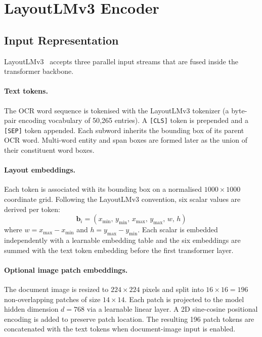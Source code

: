 \section{LayoutLMv3 Encoder}
\label{sec:layoutlmv3-encoder}

\subsection{Input Representation}
\label{sec:input-representation}

LayoutLMv3~\cite{huang2022layoutlmv3} accepts three parallel input streams that
are fused inside the transformer backbone.

\paragraph{Text tokens.}
The OCR word sequence is tokenised with the LayoutLMv3 tokenizer (a byte-pair
encoding vocabulary of 50{,}265 entries). A \texttt{[CLS]} token is prepended
and a \texttt{[SEP]} token appended. Each subword inherits the bounding box of
its parent OCR word. Multi-word entity and span boxes are formed later as the
union of their constituent word boxes.

\paragraph{Layout embeddings.}
Each token is associated with its bounding box on a normalised $1000 \times 1000$
coordinate grid. Following the LayoutLMv3 convention, six scalar values are
derived per token:
\[
  \mathbf{b}_i = (x_{\min},\, y_{\min},\, x_{\max},\, y_{\max},\, w,\, h)
\]
where $w = x_{\max} - x_{\min}$ and $h = y_{\max} - y_{\min}$. Each scalar
is embedded independently with a learnable embedding table and the six
embeddings are summed with the text token embedding before the first
transformer layer.

\paragraph{Optional image patch embeddings.}
The document image is resized to $224 \times 224$ pixels and split into
$16 \times 16 = 196$ non-overlapping patches of size $14 \times 14$.
Each patch is projected to the model hidden dimension $d = 768$ via a
learnable linear layer. A 2D sine-cosine positional encoding is added to
preserve patch location. The resulting 196 patch tokens are concatenated with
the text tokens when document-image input is enabled.

